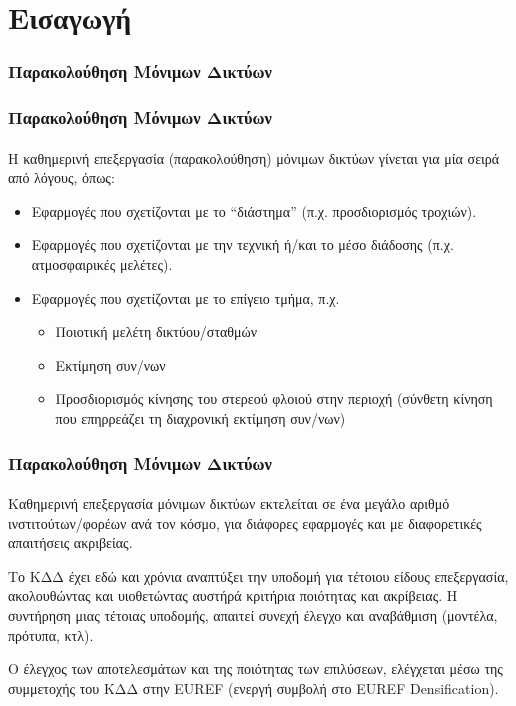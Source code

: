 \graphicspath{{Chapter1/Figs/}}

\section{Εισαγωγή}

\begin{frame}\frametitle{Παρακολούθηση Μόνιμων Δικτύων}\framesubtitle{}\label{}
\vskip-1.5cm
\end{frame}

\begin{frame}
  \frametitle{Παρακολούθηση Μόνιμων Δικτύων}
  \framesubtitle{}
  \label{}

    Η καθημερινή επεξεργασία (παρακολούθηση) μόνιμων δικτύων γίνεται για μία σειρά από λόγους,
    όπως:
    \begin{itemize}
        \item Εφαρμογές που σχετίζονται με το ``διάστημα'' (π.χ. προσδιορισμός τροχιών).
        \item Εφαρμογές που σχετίζονται με την τεχνική ή/και το μέσο διάδοσης (π.χ. ατμοσφαιρικές μελέτες).
        \item Εφαρμογές που σχετίζονται με το επίγειο τμήμα, π.χ.
        \begin{itemize}
            \item Ποιοτική μελέτη δικτύου/σταθμών
            \item Εκτίμηση συν/νων
            \item Προσδιορισμός κίνησης του στερεού φλοιού στην περιοχή (σύνθετη κίνηση που επηρρεάζει τη διαχρονική εκτίμηση συν/νων)
        \end{itemize}
    \end{itemize}
\end{frame}
\note{}

\begin{frame}
  \frametitle{Παρακολούθηση Μόνιμων Δικτύων}
  \framesubtitle{}
  \label{}

    Καθημερινή επεξεργασία μόνιμων δικτύων εκτελείται σε ένα μεγάλο αριθμό ινστιτούτων/φορέων ανά τον κόσμο,
    για διάφορες εφαρμογές και με διαφορετικές απαιτήσεις ακριβείας.
    \vspace{0.3cm}

    Το ΚΔΔ έχει εδώ και χρόνια αναπτύξει την υποδομή για τέτοιου είδους επεξεργασία, ακολουθώντας και υιοθετώντας
    αυστήρά κριτήρια ποιότητας και ακρίβειας. Η συντήρηση μιας τέτοιας υποδομής, απαιτεί συνεχή έλεγχο και
    αναβάθμιση (μοντέλα, πρότυπα, κτλ).
    \vspace{0.3cm}

    Ο έλεγχος των αποτελεσμάτων και της ποιότητας των επιλύσεων, ελέγχεται μέσω της συμμετοχής του ΚΔΔ στην EUREF
    (ενεργή συμβολή στο EUREF Densification).
\end{frame}
\note{}

